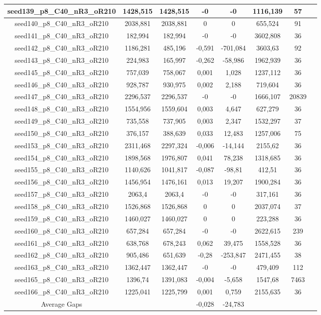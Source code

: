 \documentclass[a4paper]{article}
\begin{document}
\begin{center}
\begin{longtable}{cccccccc}
\hline
seed139\_p8\_C40\_nR3\_oR210 & 1428,515 & 1428,515 & -0 & -0 & 1116,139 & 57\\
\hline
seed140\_p8\_C40\_nR3\_oR210 & 2038,881 & 2038,881 & 0 & 0 & 655,524 & 91\\
\hline
seed141\_p8\_C40\_nR3\_oR210 & 182,994 & 182,994 & -0 & -0 & 3602,808 & 36\\
\hline
seed142\_p8\_C40\_nR3\_oR210 & 1186,281 & 485,196 & -0,591 & -701,084 & 3603,63 & 92\\
\hline
seed143\_p8\_C40\_nR3\_oR210 & 224,983 & 165,997 & -0,262 & -58,986 & 1962,939 & 36\\
\hline
seed145\_p8\_C40\_nR3\_oR210 & 757,039 & 758,067 & 0,001 & 1,028 & 1237,112 & 36\\
\hline
seed146\_p8\_C40\_nR3\_oR210 & 928,787 & 930,975 & 0,002 & 2,188 & 719,604 & 36\\
\hline
seed147\_p8\_C40\_nR3\_oR210 & 2296,537 & 2296,537 & -0 & -0 & 1666,107 & 20839\\
\hline
seed148\_p8\_C40\_nR3\_oR210 & 1554,956 & 1559,604 & 0,003 & 4,647 & 627,279 & 36\\
\hline
seed149\_p8\_C40\_nR3\_oR210 & 735,558 & 737,905 & 0,003 & 2,347 & 1532,297 & 37\\
\hline
seed150\_p8\_C40\_nR3\_oR210 & 376,157 & 388,639 & 0,033 & 12,483 & 1257,006 & 75\\
\hline
seed153\_p8\_C40\_nR3\_oR210 & 2311,468 & 2297,324 & -0,006 & -14,144 & 2155,62 & 36\\
\hline
seed154\_p8\_C40\_nR3\_oR210 & 1898,568 & 1976,807 & 0,041 & 78,238 & 1318,685 & 36\\
\hline
seed155\_p8\_C40\_nR3\_oR210 & 1140,626 & 1041,817 & -0,087 & -98,81 & 412,51 & 36\\
\hline
seed156\_p8\_C40\_nR3\_oR210 & 1456,954 & 1476,161 & 0,013 & 19,207 & 1900,284 & 36\\
\hline
seed157\_p8\_C40\_nR3\_oR210 & 2063,4 & 2063,4 & -0 & -0 & 317,161 & 36\\
\hline
seed158\_p8\_C40\_nR3\_oR210 & 1526,868 & 1526,868 & 0 & 0 & 2037,074 & 37\\
\hline
seed159\_p8\_C40\_nR3\_oR210 & 1460,027 & 1460,027 & 0 & 0 & 223,288 & 36\\
\hline
seed160\_p8\_C40\_nR3\_oR210 & 657,284 & 657,284 & -0 & -0 & 2622,615 & 239\\
\hline
seed161\_p8\_C40\_nR3\_oR210 & 638,768 & 678,243 & 0,062 & 39,475 & 1558,528 & 36\\
\hline
seed162\_p8\_C40\_nR3\_oR210 & 905,486 & 651,639 & -0,28 & -253,847 & 2471,455 & 38\\
\hline
seed163\_p8\_C40\_nR3\_oR210 & 1362,447 & 1362,447 & -0 & -0 & 479,409 & 112\\
\hline
seed165\_p8\_C40\_nR3\_oR210 & 1396,74 & 1391,083 & -0,004 & -5,658 & 1547,68 & 7463\\
\hline
seed166\_p8\_C40\_nR3\_oR210 & 1225,041 & 1225,799 & 0,001 & 0,759 & 2155,635 & 36\\
\hline
\hline
Average Gaps & & & -0,028 & -24,783 & & \\
\hline
\hline
\end{longtable}
\end{center}
\end{document}
